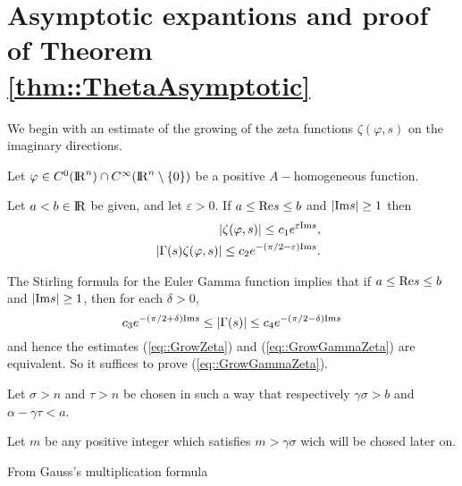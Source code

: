 \documentclass[12pt,a4paper]{amsart}
\begin{document}
\section{\label{section:ProofThetaAsymp}Asymptotic expantions
and proof of Theorem \ref{thm::ThetaAsymptotic}}
{

We begin with an estimate of the growing
of the zeta functions ${\zeta}({\varphi},{s})$
on the imaginary directions.

\begin{proposition}\label{prop::ZetaExpEpsEstimate}
Let ${\varphi}\in C^0({{\rm I\kern-.185em R}}^{n})\cap C^{\infty}({{\rm I\kern-.185em R}}^{n}\setminus\{0\})$
be a positive ${A}-$homogeneous function.

Let ${a}<{b}\in{{\rm I\kern-.185em R}}$ be given,
and let ${\varepsilon}>0$.
If ${a}\leq{\mathop{\rm Re}\nolimits}{s}\leq{b}$
and ${\left|{{\mathop{\rm Im}\nolimits}{s}}\right|}\geq 1$ then
\begin{eqnarray}
\label{eq::GrowZeta}
	&&{\left|{{\zeta}({\varphi},{s})}\right|}
	\leq{c}_1e^{{\varepsilon}{\mathop{\rm Im}\nolimits}{s}},
\\
\label{eq::GrowGammaZeta}
	&&{\left|{\Gamma({s}){\zeta}({\varphi},{s})}\right|}
	\leq{c}_2e^{-(\pi/2-{\varepsilon}){\mathop{\rm Im}\nolimits}{s}}.
\end{eqnarray}
\end{proposition}

{\removelastskip\par\medskip\goodbreak{}}
The Stirling formula for the Euler Gamma function implies that
if ${a}\leq{\mathop{\rm Re}\nolimits}{s}\leq{b}$
and ${\left|{{\mathop{\rm Im}\nolimits}{s}}\right|}\geq 1$,
then for each ${\delta}>0$,
\begin{equation}\label{eq::GrowGamma}
	{c}_3e^{-(\pi/2+{\delta}){\mathop{\rm Im}\nolimits}{s}}
	\leq{\left|{\Gamma({s})}\right|}
	\leq{c}_4e^{-(\pi/2-{\delta}){\mathop{\rm Im}\nolimits}{s}}
\end{equation}
and hence the estimates (\ref{eq::GrowZeta}) and
(\ref{eq::GrowGammaZeta}) are equivalent.
So it suffices to prove (\ref{eq::GrowGammaZeta}).

Let ${\sigma}>{n}$ and ${\tau}>{n}$
be chosen in such a way
that respectively ${\gamma}{\sigma}>{b}$
and ${\alpha}-{\gamma}{\tau}<{a}$.

Let ${m}$ be any positive integer which satisfies
${m}>{\gamma}{\sigma}$ wich will be chosed later on.

From Gauss's multiplication formula

}
\end{document}
